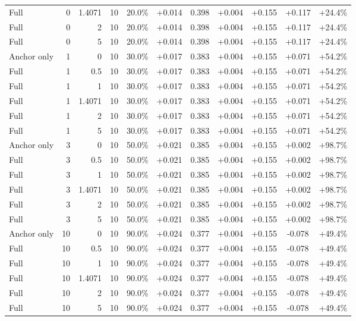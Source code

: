 \begin{table}[htbp]
\begin{tabular}{lrrrccccccc}
Full & 0 & 1.4071 & 10 & 20.0\% & +0.014 & 0.398 & +0.004 & +0.155 & +0.117 & +24.4\% \\
Full & 0 & 2 & 10 & 20.0\% & +0.014 & 0.398 & +0.004 & +0.155 & +0.117 & +24.4\% \\
Full & 0 & 5 & 10 & 20.0\% & +0.014 & 0.398 & +0.004 & +0.155 & +0.117 & +24.4\% \\
Anchor only & 1 & 0 & 10 & 30.0\% & +0.017 & 0.383 & +0.004 & +0.155 & +0.071 & +54.2\% \\
Full & 1 & 0.5 & 10 & 30.0\% & +0.017 & 0.383 & +0.004 & +0.155 & +0.071 & +54.2\% \\
Full & 1 & 1 & 10 & 30.0\% & +0.017 & 0.383 & +0.004 & +0.155 & +0.071 & +54.2\% \\
Full & 1 & 1.4071 & 10 & 30.0\% & +0.017 & 0.383 & +0.004 & +0.155 & +0.071 & +54.2\% \\
Full & 1 & 2 & 10 & 30.0\% & +0.017 & 0.383 & +0.004 & +0.155 & +0.071 & +54.2\% \\
Full & 1 & 5 & 10 & 30.0\% & +0.017 & 0.383 & +0.004 & +0.155 & +0.071 & +54.2\% \\
Anchor only & 3 & 0 & 10 & 50.0\% & +0.021 & 0.385 & +0.004 & +0.155 & +0.002 & +98.7\% \\
Full & 3 & 0.5 & 10 & 50.0\% & +0.021 & 0.385 & +0.004 & +0.155 & +0.002 & +98.7\% \\
Full & 3 & 1 & 10 & 50.0\% & +0.021 & 0.385 & +0.004 & +0.155 & +0.002 & +98.7\% \\
Full & 3 & 1.4071 & 10 & 50.0\% & +0.021 & 0.385 & +0.004 & +0.155 & +0.002 & +98.7\% \\
Full & 3 & 2 & 10 & 50.0\% & +0.021 & 0.385 & +0.004 & +0.155 & +0.002 & +98.7\% \\
Full & 3 & 5 & 10 & 50.0\% & +0.021 & 0.385 & +0.004 & +0.155 & +0.002 & +98.7\% \\
Anchor only & 10 & 0 & 10 & 90.0\% & +0.024 & 0.377 & +0.004 & +0.155 & -0.078 & +49.4\% \\
Full & 10 & 0.5 & 10 & 90.0\% & +0.024 & 0.377 & +0.004 & +0.155 & -0.078 & +49.4\% \\
Full & 10 & 1 & 10 & 90.0\% & +0.024 & 0.377 & +0.004 & +0.155 & -0.078 & +49.4\% \\
Full & 10 & 1.4071 & 10 & 90.0\% & +0.024 & 0.377 & +0.004 & +0.155 & -0.078 & +49.4\% \\
Full & 10 & 2 & 10 & 90.0\% & +0.024 & 0.377 & +0.004 & +0.155 & -0.078 & +49.4\% \\
Full & 10 & 5 & 10 & 90.0\% & +0.024 & 0.377 & +0.004 & +0.155 & -0.078 & +49.4\% \\

\end{tabular}
\end{table}
